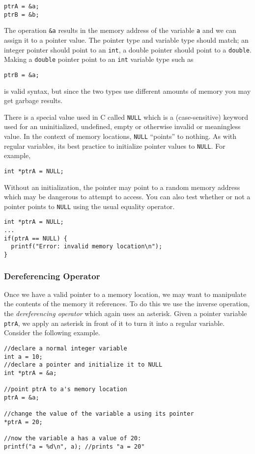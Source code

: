 \begin{verbatim}
ptrA = &a;
ptrB = &b;
\end{verbatim}

The operation \texttt{&a} results in the memory address of the
variable \texttt{a} and we can assign it to a pointer value.
The pointer type and variable type should match; an integer pointer
should point to an \texttt{int}, a double pointer should point 
to a \texttt{double}.
Making a \texttt{double} pointer point to an \texttt{int}
variable type such as

\texttt{ptrB = &a;}

is valid syntax, but since the two types use different amounts of memory
you may get garbage results.

There is a special value used in C called \texttt{NULL} which
is a (case-sensitive) keyword used for an uninitialized, undefined, empty or otherwise
invalid or meaningless value.  In the context of memory locations, 
\texttt{NULL} ``points'' to nothing.  As with regular variables,
its best practice to initialize pointer values to \texttt{NULL}.
For example, 

\texttt{int *ptrA = NULL;}

Without an initialization, the pointer may point to a random memory
address which may be dangerous to attempt to access.  You can also
test whether or not a pointer points to \texttt{NULL} using the 
usual equality operator.

\begin{verbatim}
int *ptrA = NULL;
...
if(ptrA == NULL) {
  printf("Error: invalid memory location\n");
}
\end{verbatim}

\subsubsection{Dereferencing Operator}

Once we have a valid pointer to a memory location, we may want
to manipulate the contents of the memory it references.  To do this
we use the inverse operation, the \emph{dereferencing operator}
which again uses an asterisk.  Given a pointer variable \texttt{ptrA}, 
we apply an asterisk in front of it to turn it into a regular variable.
Consider the following example.

\begin{verbatim}
//declare a normal integer variable
int a = 10;
//declare a pointer and initialize it to NULL
int *ptrA = &a;

//point ptrA to a's memory location
ptrA = &a;

//change the value of the variable a using its pointer
*ptrA = 20;

//now the variable a has a value of 20:
printf("a = %d\n", a); //prints "a = 20"
\end{verbatim}

